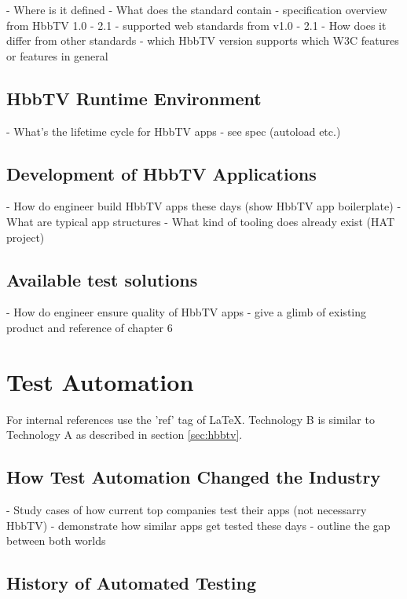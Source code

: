 - Where is it defined
- What does the standard contain
- specification overview from HbbTV 1.0 - 2.1
- supported web standards from v1.0 - 2.1
- How does it differ from other standards
- which HbbTV version supports which W3C features or features in general

\subsection{HbbTV Runtime Environment\label{sec:hbbtvruntimeenvironment}}

- What's the lifetime cycle for HbbTV apps
- see spec (autoload etc.)

\subsection{Development of HbbTV Applications\label{sec:devofhbbtv}}

- How do engineer build HbbTV apps these days (show HbbTV app boilerplate)
- What are typical app structures
- What kind of tooling does already exist (HAT project)

\subsection{Available test solutions\label{sec:availabletestsolutions}}

- How do engineer ensure quality of HbbTV apps
- give a glimb of existing product and reference of chapter 6

\section{Test Automation\label{sec:testautomation}}

For internal references use the 'ref' tag of LaTeX. Technology B is similar to Technology A
as described in section \ref{sec:hbbtv}.

\subsection{How Test Automation Changed the Industry\label{sec:howitchanged}}

- Study cases of how current top companies test their apps (not necessarry HbbTV)
- demonstrate how similar apps get tested these days
- outline the gap between both worlds

\subsection{History of Automated Testing\label{sec:history}}

